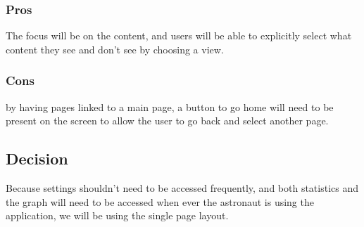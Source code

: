 \documentclass[onecolumn, draftclsnofoot,10pt, compsoc]{IEEEtran}
\begin{document}
\subsubsection*{Pros}
The focus will be on the content, and users will be able to explicitly select what content they see and don't see by choosing a view.

\subsubsection*{Cons}
by having pages linked to a main page, a button to go home will need to be present on the screen to allow the user to go back and select another page.

\subsection{Decision}
Because settings shouldn't need to be accessed frequently, and both statistics and the graph will need to be accessed when ever the astronaut is using the application, we will be using the single page layout.
\end{document}
